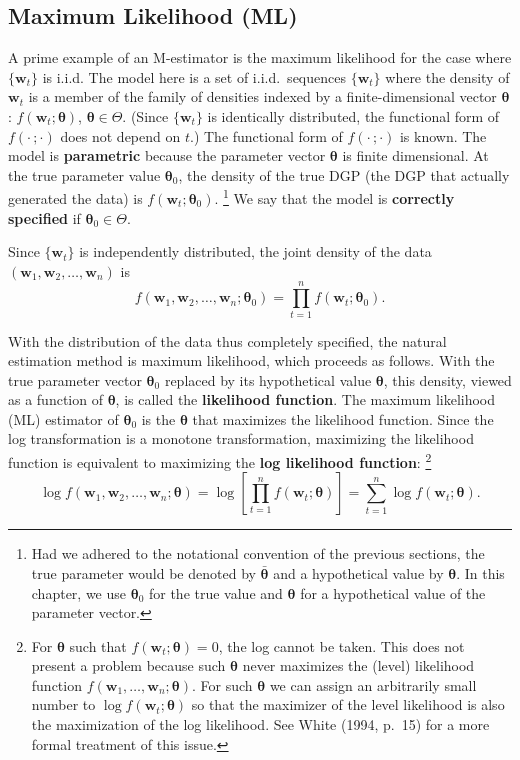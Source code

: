 \subsection*{Maximum Likelihood (ML)}

A prime example of an M-estimator is the maximum likelihood for the case where $\{\mathbf{w}_t\}$ is i.i.d. The model here is a set of i.i.d.\ sequences $\{\mathbf{w}_t\}$ where the density of $\mathbf{w}_t$ is a member of the family of densities indexed by a finite-dimensional vector $\bm{\theta}$: $f(\mathbf{w}_t; \bm{\theta})$, $\bm{\theta} \in \Theta$. (Since $\{\mathbf{w}_t\}$ is identically distributed, the functional form of $f(\cdot\,; \cdot)$ does not depend on $t$.) The functional form of $f(\cdot\,; \cdot)$ is known. The model is \textbf{parametric} because the parameter vector $\bm{\theta}$ is finite dimensional. At the true parameter value $\bm{\theta}_0$, the density of the true DGP (the DGP that actually generated the data) is $f(\mathbf{w}_t; \bm{\theta}_0)$.%
\footnote{Had we adhered to the notational convention of the previous sections, the true parameter would be denoted by $\bar{\bm{\theta}}$ and a hypothetical value by $\bm{\theta}$. In this chapter, we use $\bm{\theta}_0$ for the true value and $\bm{\theta}$ for a hypothetical value of the parameter vector.}
We say that the model is \textbf{correctly specified} if $\bm{\theta}_0 \in \Theta$.

Since $\{\mathbf{w}_t\}$ is independently distributed, the joint density of the data $(\mathbf{w}_1, \mathbf{w}_2, \ldots, \mathbf{w}_n)$ is
\begin{equation}
\label{eq:7.1.4}
f(\mathbf{w}_1, \mathbf{w}_2, \ldots, \mathbf{w}_n; \bm{\theta}_0) = \prod_{t=1}^{n} f(\mathbf{w}_t; \bm{\theta}_0).
\end{equation}

With the distribution of the data thus completely specified, the natural estimation method is maximum likelihood, which proceeds as follows. With the true parameter vector $\bm{\theta}_0$ replaced by its hypothetical value $\bm{\theta}$, this density, viewed as a function of $\bm{\theta}$, is called the \textbf{likelihood function}. The maximum likelihood (ML) estimator of $\bm{\theta}_0$ is the $\bm{\theta}$ that maximizes the likelihood function. Since the log transformation is a monotone transformation, maximizing the likelihood function is equivalent to maximizing the \textbf{log likelihood function}:%
\footnote{For $\bm{\theta}$ such that $f(\mathbf{w}_t; \bm{\theta}) = 0$, the log cannot be taken. This does not present a problem because such $\bm{\theta}$ never maximizes the (level) likelihood function $f(\mathbf{w}_1, \ldots, \mathbf{w}_n; \bm{\theta})$. For such $\bm{\theta}$ we can assign an arbitrarily small number to $\log f(\mathbf{w}_t; \bm{\theta})$ so that the maximizer of the level likelihood is also the maximization of the log likelihood. See White (1994, p.~15) for a more formal treatment of this issue.}
\begin{equation}
\label{eq:7.1.5}
\log f(\mathbf{w}_1, \mathbf{w}_2, \ldots, \mathbf{w}_n; \bm{\theta}) = \log \left[ \prod_{t=1}^{n} f(\mathbf{w}_t; \bm{\theta}) \right] = \sum_{t=1}^{n} \log f(\mathbf{w}_t; \bm{\theta}).
\end{equation}

